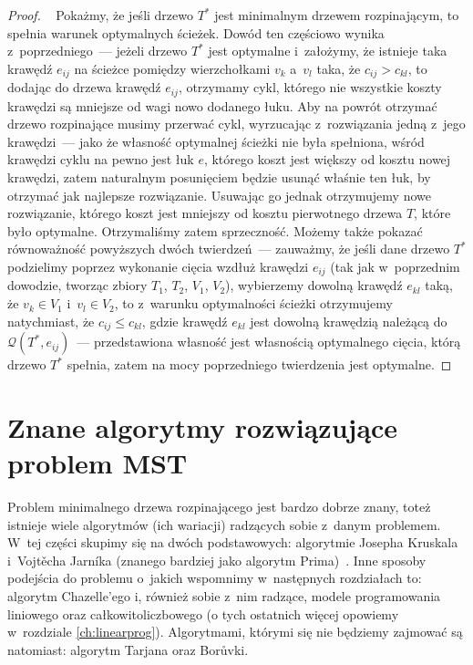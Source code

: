 \begin{proof}~\cite[$519$]{Ahuja:1993:NFT:137406}
	Pokażmy, że jeśli drzewo $T^{\ast}$ jest minimalnym drzewem rozpinającym, to spełnia warunek optymalnych ścieżek.
	Dowód ten częściowo wynika z~poprzedniego~--- jeżeli drzewo $T^{\ast}$ jest optymalne i~założymy, że istnieje taka krawędź $e_{ij}$ na ścieżce pomiędzy wierzchołkami $v_{k}$ a~$v_{l}$ taka, że $c_{ij} > c_{kl}$, to dodając do drzewa krawędź $e_{ij}$, otrzymamy cykl, którego nie wszystkie koszty krawędzi są mniejsze od wagi nowo dodanego łuku.
	Aby na powrót otrzymać drzewo rozpinające musimy przerwać cykl, wyrzucając z~rozwiązania jedną z~jego krawędzi~--- jako że własność optymalnej ścieżki nie była spełniona, wśród krawędzi cyklu na pewno jest łuk $e$, którego koszt jest większy od kosztu nowej krawędzi, zatem naturalnym posunięciem będzie usunąć właśnie ten łuk, by otrzymać jak najlepsze rozwiązanie.
	Usuwając go jednak otrzymujemy nowe rozwiązanie, którego koszt jest mniejszy od kosztu pierwotnego drzewa $T$, które było optymalne.
	Otrzymaliśmy zatem sprzeczność.
	Możemy także pokazać równoważność powyższych dwóch twierdzeń~--- zauważmy, że jeśli dane drzewo $T^{\ast}$ podzielimy poprzez wykonanie cięcia wzdłuż krawędzi $e_{ij}$ (tak jak w~poprzednim dowodzie, tworząc zbiory $T_{1}$, $T_{2}$, $V_{1}$, $V_{2}$), wybierzemy dowolną krawędź $e_{kl}$ taką, że $v_{k} \in V_{1}$ i~$v_{l} \in V_{2}$, to z~warunku optymalności ścieżki otrzymujemy natychmiast, że $c_{ij} \leqslant c_{kl}$, gdzie krawędź $e_{kl}$ jest dowolną krawędzią należącą do $\mathcal{Q} \left( T^{\ast}, e_{ij} \right)$~--- przedstawiona własność jest własnością optymalnego cięcia, którą drzewo $T^{\ast}$ spełnia, zatem na mocy poprzedniego twierdzenia jest optymalne.
\end{proof}




\section{Znane algorytmy rozwiązujące problem MST}




Problem minimalnego drzewa rozpinającego jest bardzo dobrze znany, toteż istnieje wiele algorytmów (ich wariacji) radzących sobie z~danym problemem.
W~tej części skupimy się na dwóch podstawowych: algorytmie Josepha Kruskala~\cite[$520$--$522$]{Ahuja:1993:NFT:137406} i~Vojtěcha Jarníka (znanego bardziej jako algorytm Prima)~\cite[$523$--$525$]{Ahuja:1993:NFT:137406}.
Inne sposoby podejścia do problemu o~jakich wspomnimy w~następnych rozdziałach to: algorytm Chazelle'ego i, również sobie z~nim radzące, modele programowania liniowego oraz całkowitoliczbowego (o tych ostatnich więcej opowiemy w~rozdziale \ref{ch:linearprog}).
Algorytmami, którymi się nie będziemy zajmować są natomiast: algorytm Tarjana oraz Borůvki.



